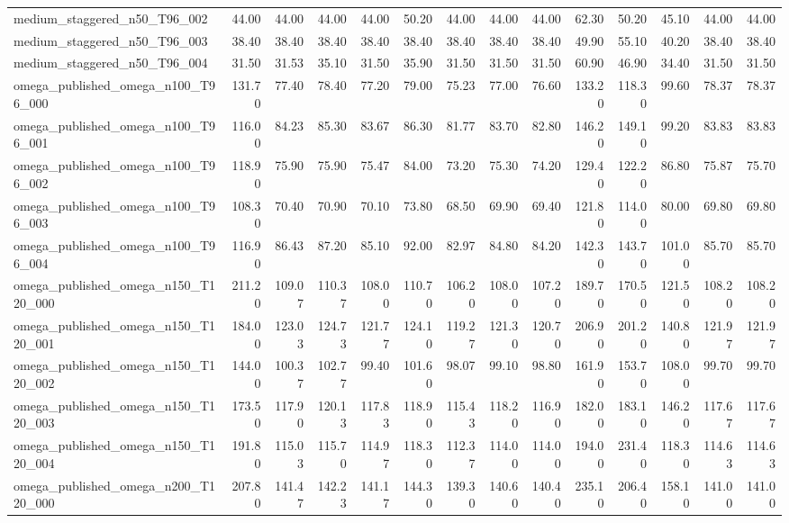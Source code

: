 \begin{table}[htbp]
\begin{tabular}{lrrrrrrrrrrrrr}
medium\_staggered\_n50\_T96\_002 & 44.00 & 44.00 & 44.00 & 44.00 & 50.20 & 44.00 & 44.00 & 44.00 & 62.30 & 50.20 & 45.10 & 44.00 & 44.00 \\
medium\_staggered\_n50\_T96\_003 & 38.40 & 38.40 & 38.40 & 38.40 & 38.40 & 38.40 & 38.40 & 38.40 & 49.90 & 55.10 & 40.20 & 38.40 & 38.40 \\
medium\_staggered\_n50\_T96\_004 & 31.50 & 31.53 & 35.10 & 31.50 & 35.90 & 31.50 & 31.50 & 31.50 & 60.90 & 46.90 & 34.40 & 31.50 & 31.50 \\
omega\_published\_omega\_n100\_T96\_000 & 131.70 & 77.40 & 78.40 & 77.20 & 79.00 & 75.23 & 77.00 & 76.60 & 133.20 & 118.30 & 99.60 & 78.37 & 78.37 \\
omega\_published\_omega\_n100\_T96\_001 & 116.00 & 84.23 & 85.30 & 83.67 & 86.30 & 81.77 & 83.70 & 82.80 & 146.20 & 149.10 & 99.20 & 83.83 & 83.83 \\
omega\_published\_omega\_n100\_T96\_002 & 118.90 & 75.90 & 75.90 & 75.47 & 84.00 & 73.20 & 75.30 & 74.20 & 129.40 & 122.20 & 86.80 & 75.87 & 75.70 \\
omega\_published\_omega\_n100\_T96\_003 & 108.30 & 70.40 & 70.90 & 70.10 & 73.80 & 68.50 & 69.90 & 69.40 & 121.80 & 114.00 & 80.00 & 69.80 & 69.80 \\
omega\_published\_omega\_n100\_T96\_004 & 116.90 & 86.43 & 87.20 & 85.10 & 92.00 & 82.97 & 84.80 & 84.20 & 142.30 & 143.70 & 101.00 & 85.70 & 85.70 \\
omega\_published\_omega\_n150\_T120\_000 & 211.20 & 109.07 & 110.37 & 108.00 & 110.70 & 106.20 & 108.00 & 107.20 & 189.70 & 170.50 & 121.50 & 108.20 & 108.20 \\
omega\_published\_omega\_n150\_T120\_001 & 184.00 & 123.03 & 124.73 & 121.77 & 124.10 & 119.27 & 121.30 & 120.70 & 206.90 & 201.20 & 140.80 & 121.97 & 121.97 \\
omega\_published\_omega\_n150\_T120\_002 & 144.00 & 100.37 & 102.77 & 99.40 & 101.60 & 98.07 & 99.10 & 98.80 & 161.90 & 153.70 & 108.00 & 99.70 & 99.70 \\
omega\_published\_omega\_n150\_T120\_003 & 173.50 & 117.90 & 120.13 & 117.83 & 118.90 & 115.43 & 118.20 & 116.90 & 182.00 & 183.10 & 146.20 & 117.67 & 117.67 \\
omega\_published\_omega\_n150\_T120\_004 & 191.80 & 115.03 & 115.70 & 114.97 & 118.30 & 112.37 & 114.00 & 114.00 & 194.00 & 231.40 & 118.30 & 114.63 & 114.63 \\
omega\_published\_omega\_n200\_T120\_000 & 207.80 & 141.47 & 142.23 & 141.17 & 144.30 & 139.30 & 140.60 & 140.40 & 235.10 & 206.40 & 158.10 & 141.00 & 141.00 \\

\end{tabular}
\end{table}

